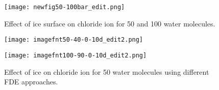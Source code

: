 \documentclass[a4paper,11pt]{report}
\begin{document}
\begin{figure}[H]\large
\texttt{[image: newfig50-100bar\_edit.png]}
\caption{Effect of ice surface on chloride ion for 50 and 100 water molecules.}
\label{figure45}
\end{figure}

\begin{figure}[H]\large
\texttt{[image: imagefnt50-40-0-10d\_edit2.png]}
\caption{}
\label{figure46}
\end{figure}

\begin{figure}[H]\large
\texttt{[image: imagefnt100-90-0-10d\_edit2.png]}
\caption{Effect of ice on chloride ion for 50 water molecules using different FDE approaches.}
\label{figure47}
\end{figure}
\end{document}
